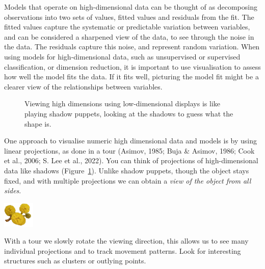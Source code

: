 \documentclass[
  letterpaper,
]{krantz}
\newcommand{\infobox}[1]{%
\noindent\colorbox{info!30}{%
\begin{minipage}{0.98\linewidth}%
    \centering%
    \begin{minipage}[c]{0.15\linewidth} %
      \includegraphics[width=1.5cm]{images/mulga-flowers2.png} %
    \end{minipage}%
    \hfill %
    \begin{minipage}[c]{0.8\linewidth} %
      \bigskip%
      \textsf{#1}%
      \bigskip%
    \end{minipage}%
    \hspace*{3mm}%
  \end{minipage}%
}%
}
\begin{document}
Models that operate on high-dimensional data can be thought of as
decomposing observations into two sets of values, fitted values and
residuals from the fit. The fitted values capture the systematic or
predictable variation between variables, and can be considered a
sharpened view of the data, to see through the noise in the data. The
residuals capture this noise, and represent random variation. When using
models for high-dimensional data, such as unsupervised or supervised
classification, or dimension reduction, it is important to use
visualisation to assess how well the model fits the data. If it fits
well, picturing the model fit might be a clearer view of the
relationships between variables. 

\begin{figure}


\caption{\label{fig-shadow-puppets}Viewing high dimensions using
low-dimensional displays is like playing shadow puppets, looking at the
shadows to guess what the shape is.}

\end{figure}%

One approach to visualise numeric high dimensional data and models is by
using linear projections, as done in a tour (Asimov, 1985; Buja \&
Asimov, 1986; Cook et al., 2006; S. Lee et al., 2022). You can think of
projections of high-dimensional data like shadows
(Figure~\ref{fig-shadow-puppets}). Unlike shadow puppets, though the
object stays fixed, and with multiple projections we can obtain a
\emph{view of the object from all sides}. 

\infobox{With a tour we slowly rotate the viewing direction, this allows us to see many individual projections and to track movement patterns. Look for interesting structures such as clusters or outlying points.}
\end{document}
